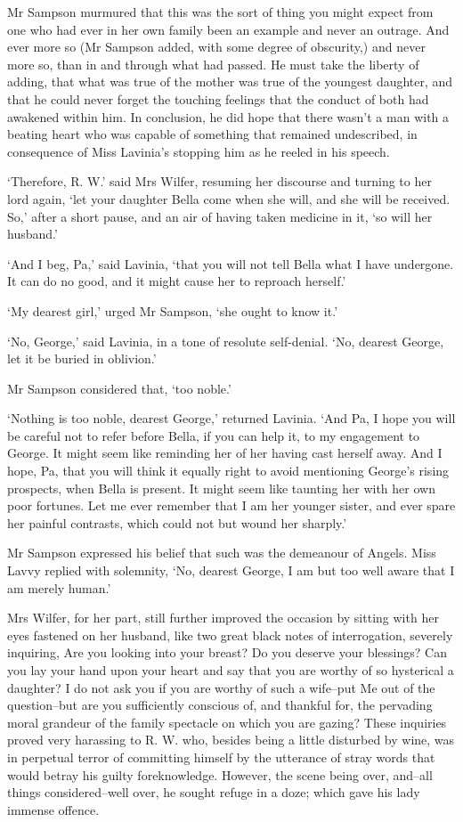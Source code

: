 Mr Sampson murmured that this was the sort of thing you might expect
from one who had ever in her own family been an example and never
an outrage. And ever more so (Mr Sampson added, with some degree of
obscurity,) and never more so, than in and through what had passed. He
must take the liberty of adding, that what was true of the mother
was true of the youngest daughter, and that he could never forget the
touching feelings that the conduct of both had awakened within him. In
conclusion, he did hope that there wasn’t a man with a beating heart who
was capable of something that remained undescribed, in consequence of
Miss Lavinia’s stopping him as he reeled in his speech.

‘Therefore, R. W.’ said Mrs Wilfer, resuming her discourse and turning
to her lord again, ‘let your daughter Bella come when she will, and she
will be received. So,’ after a short pause, and an air of having taken
medicine in it, ‘so will her husband.’

‘And I beg, Pa,’ said Lavinia, ‘that you will not tell Bella what I
have undergone. It can do no good, and it might cause her to reproach
herself.’

‘My dearest girl,’ urged Mr Sampson, ‘she ought to know it.’

‘No, George,’ said Lavinia, in a tone of resolute self-denial. ‘No,
dearest George, let it be buried in oblivion.’

Mr Sampson considered that, ‘too noble.’

‘Nothing is too noble, dearest George,’ returned Lavinia. ‘And Pa, I
hope you will be careful not to refer before Bella, if you can help
it, to my engagement to George. It might seem like reminding her of her
having cast herself away. And I hope, Pa, that you will think it equally
right to avoid mentioning George’s rising prospects, when Bella is
present. It might seem like taunting her with her own poor fortunes.
Let me ever remember that I am her younger sister, and ever spare her
painful contrasts, which could not but wound her sharply.’

Mr Sampson expressed his belief that such was the demeanour of Angels.
Miss Lavvy replied with solemnity, ‘No, dearest George, I am but too
well aware that I am merely human.’

Mrs Wilfer, for her part, still further improved the occasion by sitting
with her eyes fastened on her husband, like two great black notes of
interrogation, severely inquiring, Are you looking into your breast? Do
you deserve your blessings? Can you lay your hand upon your heart and
say that you are worthy of so hysterical a daughter? I do not ask you if
you are worthy of such a wife--put Me out of the question--but are
you sufficiently conscious of, and thankful for, the pervading moral
grandeur of the family spectacle on which you are gazing? These
inquiries proved very harassing to R. W. who, besides being a little
disturbed by wine, was in perpetual terror of committing himself by the
utterance of stray words that would betray his guilty foreknowledge.
However, the scene being over, and--all things considered--well over, he
sought refuge in a doze; which gave his lady immense offence.

